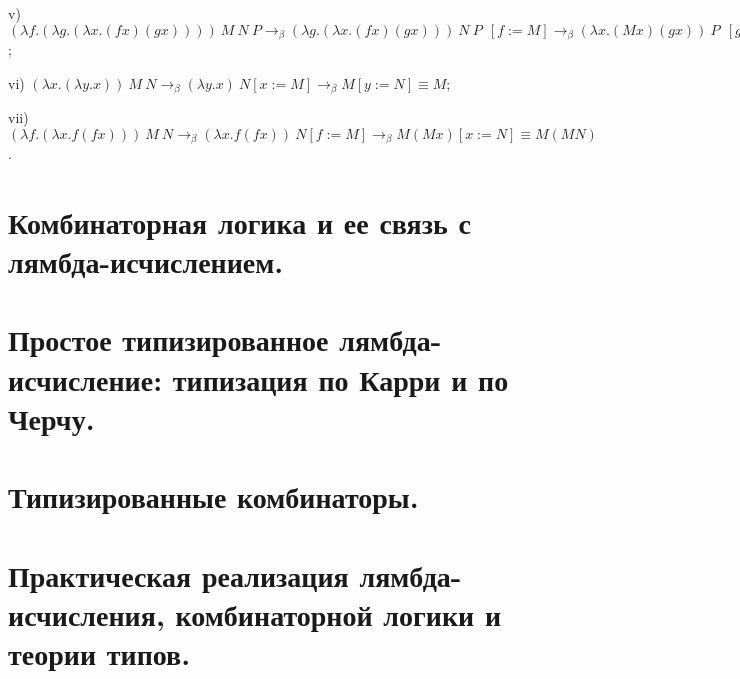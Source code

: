 \documentclass[a4paper]{article}
\begin{document}
v) $(\lambda f. (\lambda g. (\lambda x . (f x) (g x)))) \: M \: N \: P \rightarrow_{\beta} (\lambda g. (\lambda x. (f x) (g x))) \: N \: P \:\: [f := M] \rightarrow_{\beta} (\lambda x. (M x) (g x)) \: P \:\: [g := N] \rightarrow_{\beta} (M x) (N x) [x := P] \equiv (M P) (N P)$;

vi) $(\lambda x. (\lambda y. x)) \: M \: N \rightarrow_{\beta} (\lambda y. x) \: N [x := M] \rightarrow_{\beta} M [y := N] \equiv M$;

vii) $(\lambda f. (\lambda x. f(f x))) \: M \: N \rightarrow_{\beta} (\lambda x. f(f x)) \: N [f := M] \rightarrow_{\beta} M (M x) [x := N] \equiv M (M N)$.


\section{Комбинаторная логика и ее связь с лямбда-исчислением.}
\section{Простое типизированное лямбда-исчисление: типизация по Карри и по Черчу.}
\section{Типизированные комбинаторы.}
\section{Практическая реализация лямбда-исчисления, комбинаторной логики и теории типов.}
\end{document}
